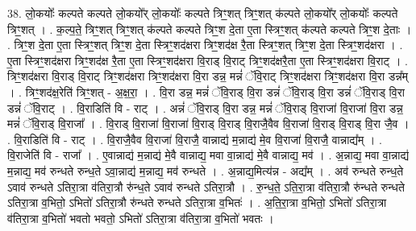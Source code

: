 \documentclass[17pt]{extarticle}
\begin{document}
38. लो॒कयोः᳚ कल्पते कल्पते लो॒कयो᳚र् लो॒कयोः᳚ कल्पते त्रिꣳ॒॒शत् त्रिꣳ॒॒शत् क॑ल्पते लो॒कयो᳚र् लो॒कयोः᳚ कल्पते त्रिꣳ॒॒शत् । . क॒ल्प॒ते॒ त्रिꣳ॒॒शत् त्रिꣳ॒॒शत् क॑ल्पते कल्पते त्रिꣳ॒॒श दे॒ता ए॒ता स्त्रिꣳ॒॒शत् क॑ल्पते कल्पते त्रिꣳ॒॒श दे॒ताः । . त्रिꣳ॒॒श दे॒ता ए॒ता स्त्रिꣳ॒॒शत् त्रिꣳ॒॒श दे॒ता स्त्रिꣳ॒॒शद॑क्षरा त्रिꣳ॒॒शद॑क्ष रै॒ता स्त्रिꣳ॒॒शत् त्रिꣳ॒॒श दे॒ता स्त्रिꣳ॒॒शद॑क्षरा । . ए॒ता स्त्रिꣳ॒॒शद॑क्षरा त्रिꣳ॒॒शद॑क्ष रै॒ता ए॒ता स्त्रिꣳ॒॒शद॑क्षरा वि॒राड् वि॒राट् त्रिꣳ॒॒शद॑क्षरै॒ता ए॒ता स्त्रिꣳ॒॒शद॑क्षरा वि॒राट् । . त्रिꣳ॒॒शद॑क्षरा वि॒राड् वि॒राट् त्रिꣳ॒॒शद॑क्षरा त्रिꣳ॒॒शद॑क्षरा वि॒रा डन्न॒ मन्नं॑ ॅवि॒राट् त्रिꣳ॒॒शद॑क्षरा त्रिꣳ॒॒शद॑क्षरा वि॒रा डन्न᳚म् । . त्रिꣳ॒॒शद॑क्ष॒रेति॑ त्रिꣳ॒॒शत् - अ॒क्ष॒रा॒ । . वि॒रा डन्न॒ मन्नं॑ ॅवि॒राड् वि॒रा डन्नं॑ ॅवि॒राड् वि॒रा डन्नं॑ ॅवि॒राड् वि॒रा डन्नं॑ ॅवि॒राट् । . वि॒राडिति॑ वि - राट् । . अन्नं॑ ॅवि॒राड् वि॒रा डन्न॒ मन्नं॑ ॅवि॒राड् वि॒राजा॑ वि॒राजा॑ वि॒रा डन्न॒ मन्नं॑ ॅवि॒राड् वि॒राजा᳚ । . वि॒राड् वि॒राजा॑ वि॒राजा॑ वि॒राड् वि॒राड् वि॒राजै॒वैव वि॒राजा॑ वि॒राड् वि॒राड् वि॒रा जै॒व । . वि॒राडिति॑ वि - राट् । . वि॒राजै॒वैव वि॒राजा॑ वि॒राजै॒ वान्नाद्य॑ म॒न्नाद्य॑ मे॒व वि॒राजा॑ वि॒राजै॒ वान्नाद्य᳚म् । . वि॒राजेति॑ वि - राजा᳚ । . ए॒वान्नाद्य॑ म॒न्नाद्य॑ मे॒वै वान्नाद्य॒ मवा वा॒न्नाद्य॑ मे॒वै वान्नाद्य॒ मव॑ । . अ॒न्नाद्य॒ मवा वा॒न्नाद्य॑ म॒न्नाद्य॒ मव॑ रुन्धते रुन्ध॒ते ऽवा॒न्नाद्य॑ म॒न्नाद्य॒ मव॑ रुन्धते । . अ॒न्नाद्य॒मित्य॑न्न - अद्य᳚म् । . अव॑ रुन्धते रुन्ध॒ते ऽवाव॑ रुन्धते ऽतिरा॒त्रा व॑तिरा॒त्रौ रु॑न्ध॒ते ऽवाव॑ रुन्धते ऽतिरा॒त्रौ । . रु॒न्ध॒ते॒ ऽति॒रा॒त्रा व॑तिरा॒त्रौ रु॑न्धते रुन्धते ऽतिरा॒त्रा व॒भितो॒ ऽभितो॑ ऽतिरा॒त्रौ रु॑न्धते रुन्धते ऽतिरा॒त्रा व॒भितः॑ । . अ॒ति॒रा॒त्रा व॒भितो॒ ऽभितो॑ ऽतिरा॒त्रा व॑तिरा॒त्रा व॒भितो॑ भवतो भवतो॒ ऽभितो॑ ऽतिरा॒त्रा व॑तिरा॒त्रा व॒भितो॑ भवतः । \newline
\end{document}
